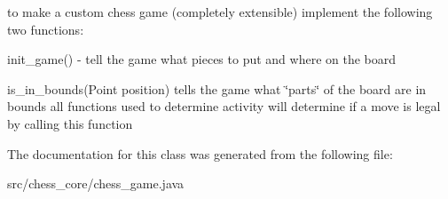 to make a custom chess game (completely extensible) implement the following two functions\+:
\begin{DoxyItemize}
\item init\+\_\+game() -\/ tell the game what pieces to put and where on the board
\item is\+\_\+in\+\_\+bounds(\+Point position) tells the game what \char`\"{}parts\char`\"{} of the board are in bounds all functions used to determine activity will determine if a move is legal by calling this function 
\end{DoxyItemize}

The documentation for this class was generated from the following file\+:\begin{DoxyCompactItemize}
\item 
src/chess\+\_\+core/chess\+\_\+game.\+java\end{DoxyCompactItemize}
